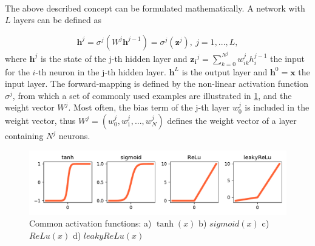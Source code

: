 \documentclass[main]{subfiles}
\begin{document}
	\paragraph{}
	\noindent
	The above described concept can be formulated mathematically. A network with $L$ layers can be defined as 
	
	\begin{equation}
	\bm{h}^j = \sigma^j(W^j\bm{h}^{j-1}) = \sigma^j(\bm{z}^j),\ j=1, ..., L ,
	\end{equation}
	where $\bm{h}^{j}$ is the state of the j-th hidden layer and $\bm{z_i}^j = \sum_{k=0}^{N^j} w_{ik}^j h_i^{j-1}$ the input for the $i$-th neuron in the j-th hidden layer.  $\bm{h}^L$ is the output layer and $\bm{h}^0=\bm{x}$ the input layer. The forward-mapping is defined by the non-linear activation function $\sigma^j$, from which a set of commonly used examples are illustrated in \cref{fig:activation}, and the weight vector $W^j$. Most often, the bias term of the j-th layer $w_{0}^{j}$ is included in the weight vector, thus $W^j = (w_{0}^{j}, w_{1}^{j}, ..., w_{N}^{j})$ defines the weight vector of a layer containing $N^j$ neurons. 
	\begin{figure}[t]
		\centering
		\includegraphics[width=0.99\linewidth]{02_TrainingMethodsForDeepANNs/figures/activations.pdf}
		\caption{Common activation functions: a) $\tanh(x)$ b) $sigmoid(x)$ c) $ReLu(x)$ d) $leakyReLu(x)$}
		\label{fig:activation}
	\end{figure}
	
\end{document}
